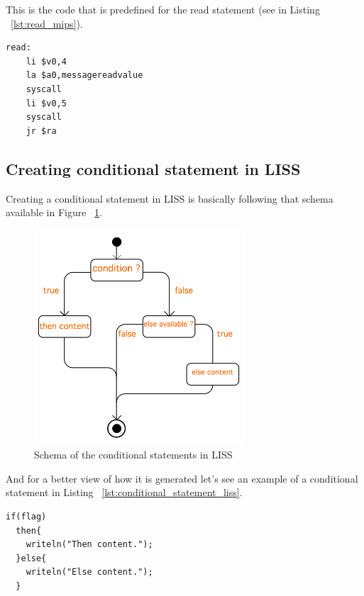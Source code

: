 \documentclass[
  oneside,
  11pt, a4paper,
  footinclude=true,
  headinclude=true,
  cleardoublepage=empty
]{scrbook}
\begin{document}
This is the code that is predefined for the read statement (see in Listing ~\ref{lst:read_mips}).

\begin{lstlisting}[caption={Read statement code in MIPS},label={lst:read_mips}]
  read: 
    li $v0,4
    la $a0,messagereadvalue
    syscall
    li $v0,5
    syscall
    jr $ra
\end{lstlisting}

\subsection{Creating conditional statement in LISS}

Creating a conditional statement in LISS is basically following that schema available in Figure ~\ref{fig:conditional_figure}.

\begin{figure}[h!]
  \centering
    \includegraphics[width=0.7\textwidth]{img/conditional_statement.png}
    \caption{Schema of the conditional statements in LISS}
    \label{fig:conditional_figure}
\end{figure}

And for a better view of how it is generated let's see an example of a conditional statement in Listing ~\ref{lst:conditional_statement_liss}.

\begin{lstlisting}[caption={Example of conditional statement in LISS},label={lst:conditional_statement_liss}]
  if(flag)
  then{
    writeln("Then content.");
  }else{
    writeln("Else content.");
  }
\end{lstlisting}
\end{document}

